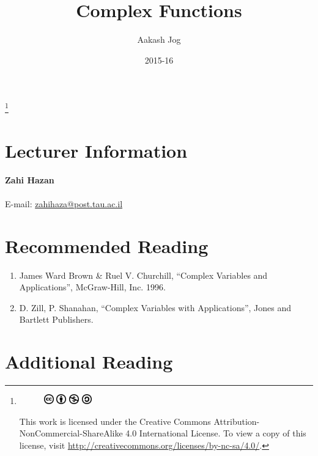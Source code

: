\documentclass[fleqn, a4paper, 12pt, twoside]{article}
\title{Complex Functions}
\author{Aakash Jog}
\date{2015-16}
\theoremstyle{definition}
\theoremstyle{theorem}
\newcommand\blfootnote[1]{%
	\begingroup
	\renewcommand\thefootnote{}\footnote{#1}%
	\addtocounter{footnote}{-1}%
	\endgroup
}
\begin{document}
\maketitle

\blfootnote
{	
	\begin{figure}[H]
		\includegraphics[height = 12pt]{cc.eps}
		\includegraphics[height = 12pt]{by.eps}
		\includegraphics[height = 12pt]{nc.eps}
		\includegraphics[height = 12pt]{sa.eps}
	\end{figure}
	This work is licensed under the Creative Commons Attribution-NonCommercial-ShareAlike 4.0 International License. To view a copy of this license, visit \url{http://creativecommons.org/licenses/by-nc-sa/4.0/}.
} %

\tableofcontents

\newpage
\section{Lecturer Information}

\textbf{Zahi Hazan}\\
~\\
E-mail: \href{mailto:zahihaza@post.tau.ac.il}{zahihaza@post.tau.ac.il}\\

\section{Recommended Reading}

\begin{enumerate}
	\item James Ward Brown \& Ruel V. Churchill, ``Complex Variables and Applications'', McGraw-Hill, Inc. 1996.
	\item D. Zill, P. Shanahan, ``Complex Variables with Applications'', Jones and Bartlett Publishers.
\end{enumerate}

\section{Additional Reading}
\end{document}

